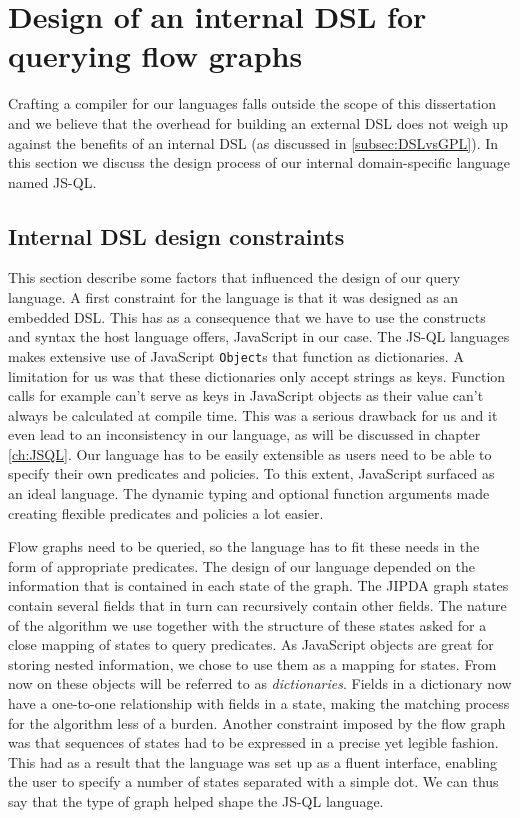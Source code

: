 \section{Design of an internal DSL for querying flow graphs}

Crafting a compiler for our languages falls outside the scope of this dissertation and we believe that the overhead for building an external DSL does not weigh up against the benefits of an internal DSL (as discussed in \ref{subsec:DSLvsGPL}).
In this section we discuss the design process of our internal domain-specific language named JS-QL.

\subsection{Internal DSL design constraints}

This section describe some factors that influenced the design of our query language. A first constraint for the language is that it was designed as an embedded DSL. This has as a consequence that we have to use the constructs and syntax the host language offers, JavaScript in our case. The JS-QL languages makes extensive use of JavaScript \texttt{Object}s that function as dictionaries. A limitation for us was that these dictionaries only accept strings as keys. Function calls for example can't serve as keys in JavaScript objects as their value can't always be calculated at compile time. This was a serious drawback for us and it even lead to an inconsistency in our language, as will be discussed in chapter \ref{ch:JSQL}. 
Our language has to be easily extensible as users need to be able to specify their own predicates and policies. To this extent, JavaScript surfaced as an ideal language. The dynamic typing and optional function arguments made creating flexible predicates and policies a lot easier.

Flow graphs need to be queried, so the language has to fit these needs in the form of appropriate predicates. The design of our language depended on the information that is contained in each state of the graph. The JIPDA graph states contain several fields that in turn can recursively contain other fields. The nature of the algorithm we use together with the structure of these states asked for a close mapping of states to query predicates. As JavaScript objects are great for storing nested information, we chose to use them as a mapping for states. From now on these objects will be referred to as \textit{dictionaries}. Fields in a dictionary now have a one-to-one relationship with fields in a state, making the matching process for the algorithm less of a burden. Another constraint imposed by the flow graph was that sequences of states had to be expressed in a precise yet legible fashion. This had as a result that the language was set up as a fluent interface, enabling the user to specify a number of states separated with a simple dot. We can thus say that the type of graph helped shape the JS-QL language.

